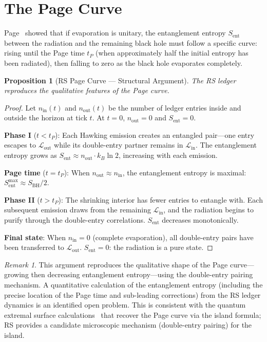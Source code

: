 \documentclass[12pt,a4paper]{article}
\newtheorem{proposition}[theorem]{Proposition}
\theoremstyle{definition}
\theoremstyle{remark}
\newtheorem{remark}[theorem]{Remark}
\begin{document}
\section{The Page Curve}
\label{sec:page}

Page~\cite{Page1993} showed that if evaporation is unitary, the
entanglement entropy $S_{\mathrm{ent}}$ between the radiation and
the remaining black hole must follow a specific curve: rising until
the Page time $t_P$ (when approximately half the initial entropy
has been radiated), then falling to zero as the black hole
evaporates completely.

\begin{proposition}[RS Page Curve --- Structural Argument]
\label{thm:page}
The RS ledger reproduces the qualitative features of the Page curve.
\end{proposition}

\begin{proof}
Let $n_{\mathrm{in}}(t)$ and $n_{\mathrm{out}}(t)$ be the number
of ledger entries inside and outside the horizon at tick $t$.  At
$t = 0$, $n_{\mathrm{out}} = 0$ and $S_{\mathrm{ent}} = 0$.

\textbf{Phase I} ($t < t_P$): Each Hawking emission creates an
entangled pair---one entry escapes to $\mathcal{L}_{\mathrm{out}}$
while its double-entry partner remains in
$\mathcal{L}_{\mathrm{in}}$.  The entanglement entropy grows as
$S_{\mathrm{ent}} \approx n_{\mathrm{out}} \cdot k_B \ln 2$,
increasing with each emission.

\textbf{Page time} ($t = t_P$): When
$n_{\mathrm{out}} \approx n_{\mathrm{in}}$, the entanglement
entropy is maximal:
$S_{\mathrm{ent}}^{\max} \approx S_{\mathrm{BH}}/2$.

\textbf{Phase II} ($t > t_P$): The shrinking interior has fewer
entries to entangle with.  Each subsequent emission draws from
the remaining $\mathcal{L}_{\mathrm{in}}$, and the radiation
begins to purify through the double-entry correlations.
$S_{\mathrm{ent}}$ decreases monotonically.

\textbf{Final state}: When $n_{\mathrm{in}} = 0$
(complete evaporation), all double-entry pairs have been
transferred to $\mathcal{L}_{\mathrm{out}}$.
$S_{\mathrm{ent}} = 0$: the radiation is a pure state.
\end{proof}

\begin{remark}
This argument reproduces the qualitative shape of the Page
curve---growing then decreasing entanglement entropy---using the
double-entry pairing mechanism.  A quantitative calculation of the
entanglement entropy (including the precise location of the Page
time and sub-leading corrections) from the RS ledger dynamics is an
identified open problem.  This is consistent with the quantum
extremal surface calculations~\cite{Penington2020} that recover the
Page curve via the island formula; RS provides a candidate
microscopic mechanism (double-entry pairing) for the island.
\end{remark}
\end{document}
